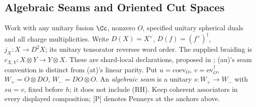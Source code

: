 
\subsection{Algebraic Seams and Oriented Cut Spaces}

Work with any unitary fusion \(\Cc\), nonzero \(O\), specified unitary spherical duals and all charge multiplicities.
Write \(D(X)=X^\vee\), \(D(f)=(f^\vee)^\dagger\), \(j_X:X\to D^2X\); its unitary tensorator reverses word order.
The supplied braiding is \(c_{X,Y}:X\otimes Y\to Y\otimes X\). These are shard-local declarations,
proposed in ; (au)'s seam convention is distinct from (at)'s linear parity.
Put \(u=\mathrm{coev}_O\), \(v=\mathrm{ev}_O^\dagger\), \(W_+=O\otimes DO\), \(W_-=DO\otimes O\).
An \emph{algebraic seam} is a unitary \(s:W_+\to W_-\) with \(su=v\), fixed before \(h\); it does not include (RH).
Keep coherent associators in every displayed composition; [P] denotes Penneys at the anchors above.

